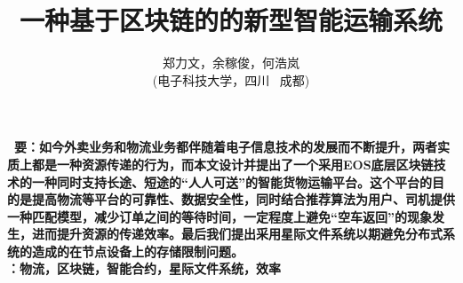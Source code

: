\documentclass[UTF8]{ctexart}
\title{\textbf{一种基于区块链的的新型智能运输系统}}
\author{\sffamily 郑力文，余稼俊，何浩岚\\ \sffamily(电子科技大学，四川 \ 成都)}
\date{}
\begin{document}
  \maketitle
  \textbf{ \ 要：\heiti  \small 如今外卖业务和物流业务都伴随着电子信息技术的发展而不断提升，两者实质上都是一种资源传递的行为，而本文设计并提出了一个采用EOS底层区块链技术的一种同时支持长途、短途的“人人可送”的智能货物运输平台。这个平台的目的是提高物流等平台的可靠性、数据安全性，同时结合推荐算法为用户、司机提供一种匹配模型，减少订单之间的等待时间，一定程度上避免“空车返回”的现象发生，进而提升资源的传递效率。最后我们提出采用星际文件系统以期避免分布式系统的造成的在节点设备上的存储限制问题。}
  \\
  \indent \textbf{：\heiti  \small 物流，区块链，智能合约，星际文件系统，效率}
  \pagestyle{plain}	%
  \\
  \\




\end{document}
